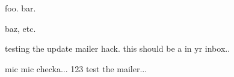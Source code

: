 foo. bar.

baz, etc.

testing the update mailer hack.  this should be a \delta in yr inbox..

mic mic checka... 123
test the mailer...
